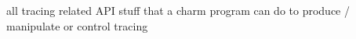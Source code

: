 all tracing related API
stuff that a charm program can do to produce / manipulate or control tracing
